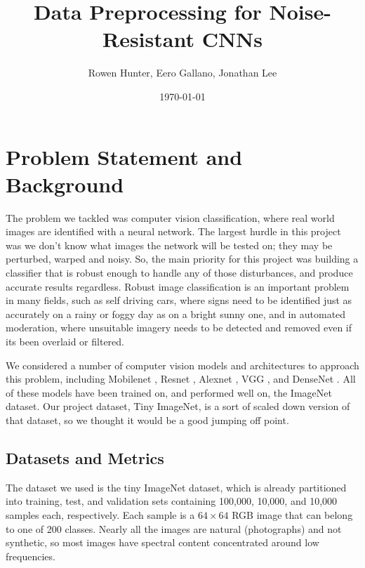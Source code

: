 \documentclass[justified]{article}
\begin{document}
  \title{Data Preprocessing for Noise-Resistant CNNs}
  \author{Rowen Hunter, Eero Gallano, Jonathan Lee}
  \date{\today}
  \maketitle

  \section{Problem Statement and Background}

  The problem we tackled was computer vision classification, where real world images are identified with a neural network.
  The largest hurdle in this project was we don’t know what images the network will be tested on; they may be perturbed, warped and noisy. So, the main priority for this project was building a classifier that is robust enough to handle any of those disturbances, and produce accurate results regardless. Robust image classification is an important problem in many fields, such as self driving cars, where signs need to be identified just as accurately on a rainy or foggy day as on a bright sunny one, and in automated moderation, where unsuitable imagery needs to be detected and removed even if its been overlaid or filtered.

  We considered a number of computer vision models and architectures to approach this problem, including Mobilenet \cite{Sandler_2018}, Resnet \cite{7780459}, Alexnet \cite{NIPS2012_4824}, VGG \cite{simonyan2014deep}, and DenseNet \cite{i2014densenet}. All of these models have been trained on, and performed well on, the ImageNet dataset. Our project dataset, Tiny ImageNet, is a sort of scaled down version of that dataset, so we thought it would be a good jumping off point.

  \subsection{Datasets and Metrics}

  The dataset we used is the tiny ImageNet dataset, which is already partitioned into training, test, and validation sets containing 100,000, 10,000, and 10,000 samples each, respectively.
  Each sample is a $64 \times 64$ RGB image that can belong to one of 200 classes.
  Nearly all the images are natural (photographs) and not synthetic, so most images have spectral content concentrated around low frequencies.
\end{document}
